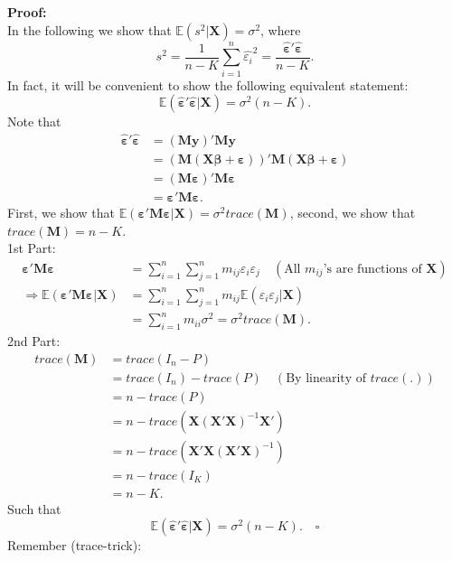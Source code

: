 \documentclass[
]{book}
\begin{document}
\textbf{Proof:}\\
In the following we show that \(\mathbb{E}(s^2|\mathbf{X})=\sigma^2\), where
\[s^2=\frac{1}{n-K}\sum_{i=1}^n\hat{\varepsilon_i}^2=\frac{\hat{\boldsymbol{\varepsilon}}'\hat{\boldsymbol{\varepsilon}}}{n-K}.\]
In fact, it will be convenient to show the following equivalent
statement: \[\mathbb{E}(\hat{\boldsymbol{\varepsilon}}'\hat{\boldsymbol{\varepsilon}}|\mathbf{X})=\sigma^2(n-K).\] Note that
\begin{align*}
\hat{\boldsymbol{\varepsilon}}'\hat{\boldsymbol{\varepsilon}}
& = (\mathbf{M}\mathbf{y})'\mathbf{M}\mathbf{y}\\
& = (\mathbf{M}(\mathbf{X}\boldsymbol{\beta}+\boldsymbol{\varepsilon}))'\mathbf{M}(\mathbf{X}\boldsymbol{\beta}+\boldsymbol{\varepsilon})\\
& = (\mathbf{M}\boldsymbol{\varepsilon})'\mathbf{M}\boldsymbol{\varepsilon}\\
& = \boldsymbol{\varepsilon}'\mathbf{M}\boldsymbol{\varepsilon}.
\end{align*}
First, we show that
\(\mathbb{E}(\boldsymbol{\varepsilon}'\mathbf{M}\boldsymbol{\varepsilon}|\mathbf{X})=\sigma^2trace(\mathbf{M})\), second, we
show that \(trace(\mathbf{M})=n-K\).\\
1st Part:
\begin{align*}
\boldsymbol{\varepsilon}'\mathbf{M}\boldsymbol{\varepsilon}
&=\sum_{i=1}^n\sum_{j=1}^n m_{ij}\varepsilon_i\varepsilon_j\quad(\text{All } m_{ij}\text{'s are functions of } \mathbf{X})\\[2ex]
\Rightarrow\mathbb{E}(\boldsymbol{\varepsilon}'\mathbf{M}\boldsymbol{\varepsilon}|\mathbf{X})
&=\sum_{i=1}^n\sum_{j=1}^n m_{ij}\mathbb{E}(\varepsilon_i\varepsilon_j|\mathbf{X})\\
&=\sum_{i=1}^n m_{ii}\sigma^2=\sigma^2trace(\mathbf{M}).
\end{align*}
2nd Part:
\begin{align*}
trace(\mathbf{M})
&= trace(I_n-P) \\
&= trace(I_n)-trace(P)\quad(\text{By linearity of } trace(.))\\
&= n-trace(P)\\
&= n-trace(\mathbf{X}(\mathbf{X}'\mathbf{X})^{-1}\mathbf{X}')\\
&= n-trace(\mathbf{X}'\mathbf{X}(\mathbf{X}'\mathbf{X})^{-1})\\
&= n-trace(I_K)\\
&= n-K.
\end{align*}
Such that
\[\mathbb{E}(\hat{\boldsymbol{\varepsilon}}'\hat{\boldsymbol{\varepsilon}}|\mathbf{X})=\sigma^2(n-K).\quad\square\] Remember
(trace-trick):
\end{document}
